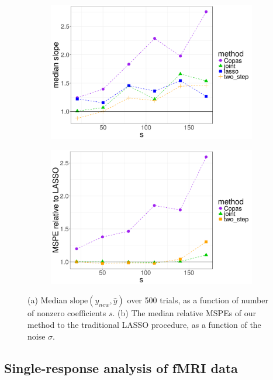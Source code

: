 \documentclass[main]{subfiles}
\begin{document}
\begin{figure}[!h]
	\centering
	\begin{subfigure}[t]{0.45\textwidth}
		\includegraphics[width = \textwidth]{./lasso_figures/slope_vs_sparsity.png}
	\end{subfigure}
  \begin{subfigure}[t]{0.45\textwidth}
    \includegraphics[width = \textwidth]{./lasso_figures/mspe_vs_sparsity.png}
  \end{subfigure}
  \caption{(a) Median $\text{slope}(y_{new}, \hat y)$ over 500 trials, as a function of number of nonzero coefficients $s$.
	(b)
	The median relative MSPEs of our method to the
	traditional LASSO procedure, as a function of the noise $\sigma$.  }
	\label{fig:lasso_results_vary_sparsity}
\end{figure}

\subsection{Single-response analysis of fMRI data}
\end{document}
